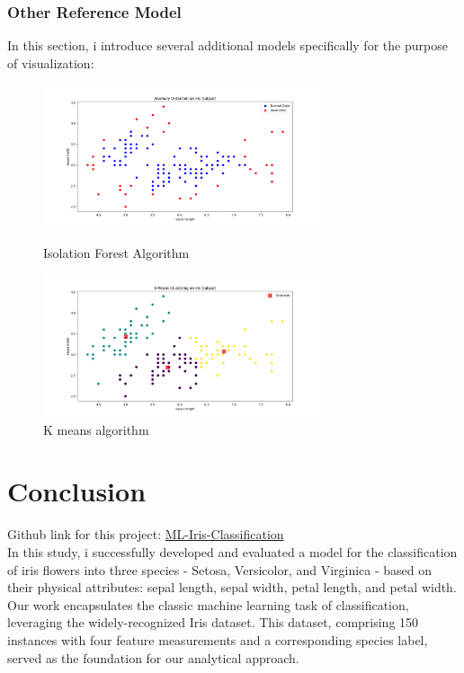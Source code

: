 \documentclass[a4paper]{article}
\begin{document}
\subsubsection{Other Reference Model}
In this section, i introduce several additional models specifically for the purpose of visualization:
\begin{figure}[h]
	\begin{minipage}{0.32\textwidth}
		\centering
		\includegraphics[height=4.2cm]{picture/Anomaly} %
		\caption{Isolation Forest Algorithm}
		\label{fig:setosa}
	\end{minipage}\hspace{3cm}
	\begin{minipage}{0.32\textwidth}
		\centering
		\includegraphics[height=4.2cm]{picture/k_mean} %
		\caption{K means algorithm}
		\label{fig:versicolour}
	\end{minipage}\hfill
\end{figure}
\newpage
\section{Conclusion}
Github link for this project:
\href{https://github.com/illubaby/ML-Iris-Classification}{ML-Iris-Classification}\\
In this study, i successfully developed and evaluated a model for the classification of iris flowers into three species - Setosa, Versicolor, and Virginica - based on their physical attributes: sepal length, sepal width, petal length, and petal width. Our work encapsulates the classic machine learning task of classification, leveraging the widely-recognized Iris dataset. This dataset, comprising 150 instances with four feature measurements and a corresponding species label, served as the foundation for our analytical approach.
\end{document}
